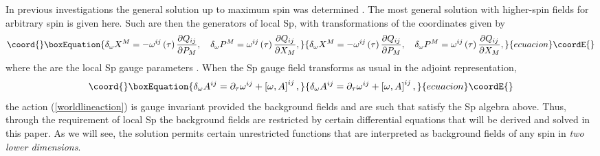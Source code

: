 \documentclass[a4paper,12pt]{article}
\begin{document}
In previous investigations the general solution up to maximum spin \coordHE{} was
determined \cite{emgrav}. The most general solution with higher-spin fields
for arbitrary spin \coordHE{} is given here. Such \coordHE{} are
then the generators of local Sp\myHighlight{$\left( 2\right) $}\coordHE{}, with transformations of
the coordinates \coordHE{} given by
\begin{equation}\coord{}\boxEquation{
\delta _{\omega }X^{M}=-\omega ^{ij}\left( \tau \right) \frac{\partial Q_{ij}
}{\partial P_{M}},\quad \delta _{\omega }P^{M}=\omega ^{ij}\left( \tau
\right) \frac{\partial Q_{ij}}{\partial X_{M}},  \label{spgauge1}
}{
\delta _{\omega }X^{M}=-\omega ^{ij}\left( \tau \right) \frac{\partial Q_{ij}
}{\partial P_{M}},\quad \delta _{\omega }P^{M}=\omega ^{ij}\left( \tau
\right) \frac{\partial Q_{ij}}{\partial X_{M}},  }{ecuacion}\coordE{}\end{equation}
where the \coordHE{}
are the local Sp\myHighlight{$\left( 2\right) $}\coordHE{} gauge parameters \cite{emgrav}. When the
Sp\myHighlight{$\left( 2\right) $}\coordHE{} gauge field \coordHE{} transforms as
usual in the adjoint representation,
\begin{equation}\coord{}\boxEquation{
\delta _{\omega }A^{ij}=\partial _{\tau }\omega ^{ij}+\left[ \omega ,A\right]
^{ij},  \label{spgauge2}
}{
\delta _{\omega }A^{ij}=\partial _{\tau }\omega ^{ij}+\left[ \omega ,A\right]
^{ij},  }{ecuacion}\coordE{}\end{equation}
the action (\ref{worldlineaction}) is gauge invariant \coordHE{}
provided the background fields \coordHE{} and \coordHE{} are such that \coordHE{} satisfy the Sp\myHighlight{$\left( 2\right) $}\coordHE{} algebra above. Thus, through
the requirement of local Sp\myHighlight{$\left( 2\right) ,$}\coordHE{} the background fields are
restricted by certain differential equations that will be derived and solved
in this paper. As we will see, the solution permits certain unrestricted
functions that are interpreted as background fields of any spin in \textit{%
two lower dimensions}.
\end{document}
